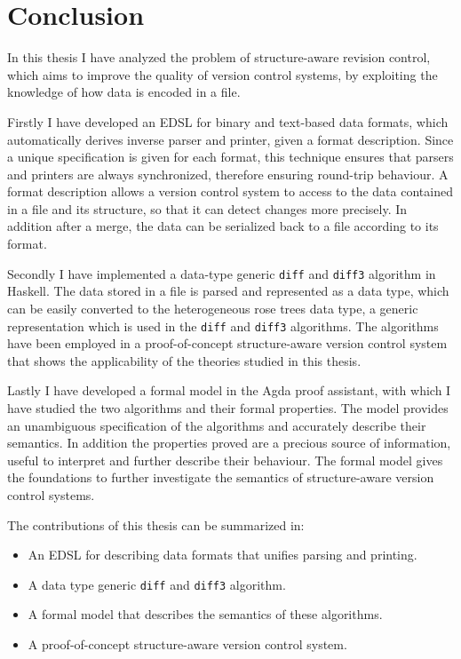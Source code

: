 \documentclass[../Thesis.tex]{subfiles}
\begin{document}
\chapter{Conclusion}
\label{chp:Conclusion}
In this thesis I have analyzed the problem of structure-aware revision control,
which aims to improve the quality of version control systems, by
exploiting the knowledge of how data is encoded in a file.

Firstly I have developed an EDSL for binary and text-based data formats, which
automatically derives inverse parser and printer, given a format description.
Since a unique specification is given for each
format, this technique ensures that parsers and printers are 
always synchronized, therefore ensuring round-trip behaviour.
A format description allows a version control system 
to access to the data contained in a file and its structure, so that 
it can detect changes more precisely. In addition
after a merge, the data can be serialized back to a file according to its format.

Secondly I have implemented a data-type generic \texttt{diff} and \texttt{diff3}
algorithm in Haskell. The data stored in a file is parsed and represented as
a data type, which can be easily converted to the heterogeneous rose trees
data type, a generic representation which is used in the \texttt{diff} and 
\texttt{diff3} algorithms. The algorithms
have been employed in a proof-of-concept structure-aware version
control system that shows the applicability of the theories studied in this 
thesis.

Lastly I have developed a formal model in the Agda proof assistant, 
with which I have studied the two algorithms and their formal properties.
The model provides an unambiguous specification of the algorithms
and accurately describe their semantics.
In addition the properties proved are a precious 
source of information, useful to interpret and further 
describe their behaviour. The formal model gives the foundations
to further investigate the semantics of structure-aware version control
systems.

The contributions of this thesis can be summarized in:
\begin{itemize}
	\item An EDSL for describing data formats that unifies parsing and printing.
	\item A data type generic \texttt{diff} and \texttt{diff3} algorithm.
	\item A formal model that describes the semantics of these algorithms.
	\item A proof-of-concept structure-aware version control system.
\end{itemize}
\end{document}
